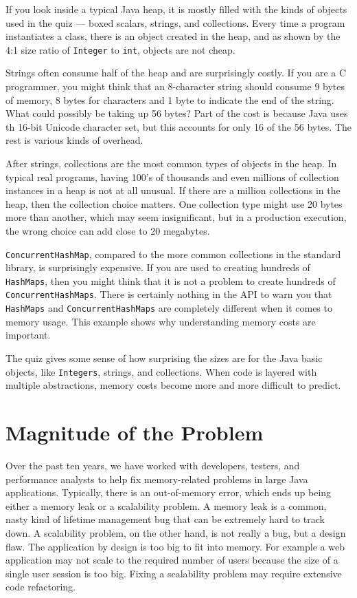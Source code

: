 If you look inside a typical Java heap, it is mostly filled with the kinds of
objects used in the quiz --- boxed scalars, strings, and collections. Every time
a program instantiates a class, there is an object created in the heap, and as
shown by the 4:1 size ratio of \texttt{Integer} to \texttt{int}, objects are not
cheap.

Strings often consume half of the heap and are surprisingly costly. If you are a
C programmer, you might think that an 8-character string should consume 9 bytes
of memory, 8 bytes for characters and 1 byte to indicate the end of the string.
What could possibly be taking up 56 bytes? Part of the cost is because Java uses
th 16-bit Unicode character set, but this accounts for only 16 of the 56 bytes.
The rest is various kinds of overhead.

After strings, collections are the most common types of objects in the heap. In
typical real programs, having 100's of thousands and even millions of collection
instances in a heap is not at all unusual. If there are a million collections in
the heap, then the collection choice matters. One collection type might use 20
bytes more than another, which may seem insignificant, but in a production
execution, the wrong choice can add close to 20 megabytes.

\texttt{ConcurrentHashMap}, compared to the more common collections in the
standard library, is surprisingly expensive. If you are used to creating
hundreds of \texttt{HashMaps}, then you might think that it is not a problem to
create hundreds of \texttt{ConcurrentHashMaps}. There is certainly nothing in
the API to warn you that \texttt{HashMaps} and \texttt{ConcurrentHashMaps} are
completely different when it comes to memory usage. This example shows why
understanding memory costs are important.

The quiz gives some sense of how surprising the sizes are for the Java basic
objects, like \texttt{Integers}, strings, and collections. When code is layered
with multiple abstractions, memory costs become more and more difficult to
predict.


\section{Magnitude of the Problem}

Over the past ten years, we have worked with developers, testers, and
performance analysts to help fix memory-related problems in large Java
applications. Typically, there is an out-of-memory error, which ends up being
either a memory leak or a scalability problem. A memory leak is a common, nasty
kind of lifetime management bug that can be extremely hard to track down. A
scalability problem, on the other hand, is not really a bug, but a design flaw.
The application by design is too big to fit into memory. For example a web
application may not scale to the required number of users because the size of a
single user session is too big. Fixing a scalability problem may require
extensive code refactoring.
  
